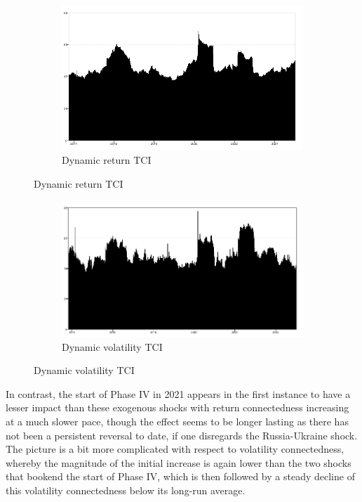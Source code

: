 \documentclass[preprint, 3p,
authoryear]{elsarticle} %
\begin{document}
\begin{figure}[!htb]
  \caption{Dynamic Return and Volatility Connectedness (Jan 2013 – Jan 2025)}
  \label{fig:dynTCI}
    \centering
      \begin{subfigure}[b]{\textwidth}
        \caption{Dynamic return TCI}
        \label{fig:dynretTCI}
        \centering
        \includegraphics[width = 0.75\linewidth]{2aDynRetTCI}
      \end{subfigure}
\end{figure}
\begin{figure}[!htb]
\ContinuedFloat
      \begin{subfigure}[b]{\textwidth}
        \caption{Dynamic volatility TCI}
        \centering
        \label{fig:dynvolTCI}
        \includegraphics[width = 0.75\linewidth]{2bDynVolTCI}
      \end{subfigure}
\end{figure}

In contrast, the start of Phase IV in 2021 appears in the first instance
to have a lesser impact than these exogenous shocks with return
connectedness increasing at a much slower pace, though the effect seems
to be longer lasting as there has not been a persistent reversal to
date, if one disregards the Russia-Ukraine shock. The picture is a bit
more complicated with respect to volatility connectedness, whereby the
magnitude of the initial increase is again lower than the two shocks
that bookend the start of Phase IV, which is then followed by a steady
decline of this volatility connectedness below its long-run average.
\end{document}
